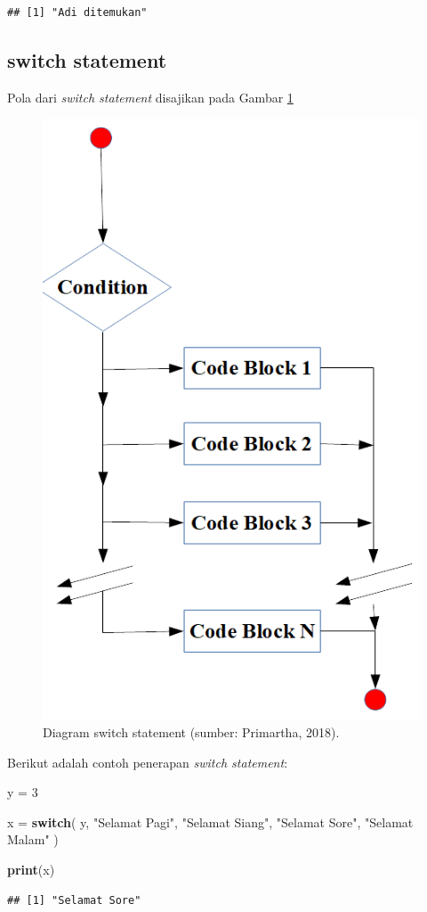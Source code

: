 \documentclass[
]{book}
\newenvironment{Shaded}{\begin{snugshade}}{\end{snugshade}}
\newcommand{\ControlFlowTok}[1]{\textcolor[rgb]{0.13,0.29,0.53}{\textbf{#1}}}
\newcommand{\DecValTok}[1]{\textcolor[rgb]{0.00,0.00,0.81}{#1}}
\newcommand{\FunctionTok}[1]{\textcolor[rgb]{0.13,0.29,0.53}{\textbf{#1}}}
\newcommand{\NormalTok}[1]{#1}
\newcommand{\OtherTok}[1]{\textcolor[rgb]{0.56,0.35,0.01}{#1}}
\newcommand{\StringTok}[1]{\textcolor[rgb]{0.31,0.60,0.02}{#1}}
\theoremstyle{definition}
\theoremstyle{definition}
\theoremstyle{definition}
\theoremstyle{definition}
\theoremstyle{remark}
\begin{document}
\begin{verbatim}
## [1] "Adi ditemukan"
\end{verbatim}

\hypertarget{switchstatement}{%
\subsection{switch statement}\label{switchstatement}}

Pola dari \emph{switch statement} disajikan pada Gambar \ref{fig:switch}

\begin{figure}

{\centering \includegraphics[width=0.4\linewidth]{./images/switch} 

}

\caption{Diagram switch statement (sumber: Primartha, 2018).}\label{fig:switch}
\end{figure}

Berikut adalah contoh penerapan \emph{switch statement}:

\begin{Shaded}
\begin{Highlighting}[]
\NormalTok{y }\OtherTok{=} \DecValTok{3}

\NormalTok{x }\OtherTok{=} \ControlFlowTok{switch}\NormalTok{(}
\NormalTok{  y,}
  \StringTok{"Selamat Pagi"}\NormalTok{,}
  \StringTok{"Selamat Siang"}\NormalTok{,}
  \StringTok{"Selamat Sore"}\NormalTok{,}
  \StringTok{"Selamat Malam"}
\NormalTok{)}

\FunctionTok{print}\NormalTok{(x)}
\end{Highlighting}
\end{Shaded}

\begin{verbatim}
## [1] "Selamat Sore"
\end{verbatim}
\end{document}

